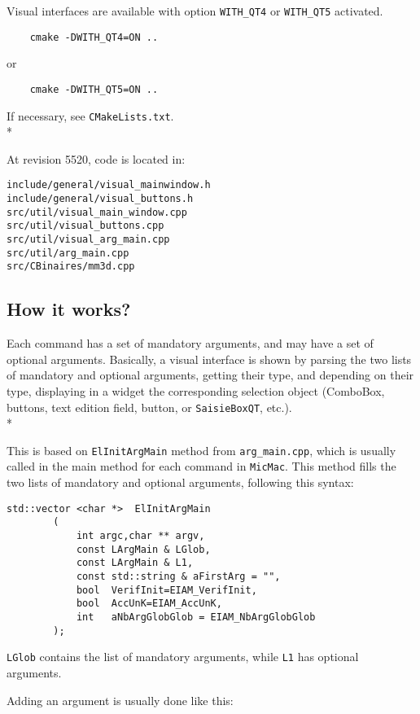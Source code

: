 \documentclass[a4paper]{book}
\begin{document}
Visual interfaces are available with option {\tt WITH\_QT4} or {\tt WITH\_QT5} activated.

\begin{verbatim}
    cmake -DWITH_QT4=ON ..
\end{verbatim}
 or
\begin{verbatim}
    cmake -DWITH_QT5=ON ..
\end{verbatim}

If necessary, see {\tt CMakeLists.txt}.\\*

At revision 5520, code is located in:
\begin{verbatim}
include/general/visual_mainwindow.h
include/general/visual_buttons.h
src/util/visual_main_window.cpp
src/util/visual_buttons.cpp
src/util/visual_arg_main.cpp
src/util/arg_main.cpp
src/CBinaires/mm3d.cpp
\end{verbatim}

\subsection{How it works?}

Each command has a set of mandatory arguments, and may have a set of optional arguments. Basically, a visual interface is shown by parsing the two lists of mandatory and optional arguments, getting their type, and depending on their type, displaying in a widget the corresponding selection object (ComboBox, buttons, text edition field, button, or {\tt SaisieBoxQT}, etc.).\\*

This is based on {\tt ElInitArgMain} method from {\tt arg\_main.cpp}, which is usually called in the main method for each command in {\tt MicMac}. This method fills the two lists of mandatory and optional arguments, following this syntax:

\begin{verbatim}
std::vector <char *>  ElInitArgMain
        (
            int argc,char ** argv,
            const LArgMain & LGlob,
            const LArgMain & L1,
            const std::string & aFirstArg = "",
            bool  VerifInit=EIAM_VerifInit,
            bool  AccUnK=EIAM_AccUnK,
            int   aNbArgGlobGlob = EIAM_NbArgGlobGlob
        );
\end{verbatim}

 {\tt LGlob} contains the list of mandatory arguments, while  {\tt L1} has optional arguments.

Adding an argument is usually done like this: 
\end{document}
